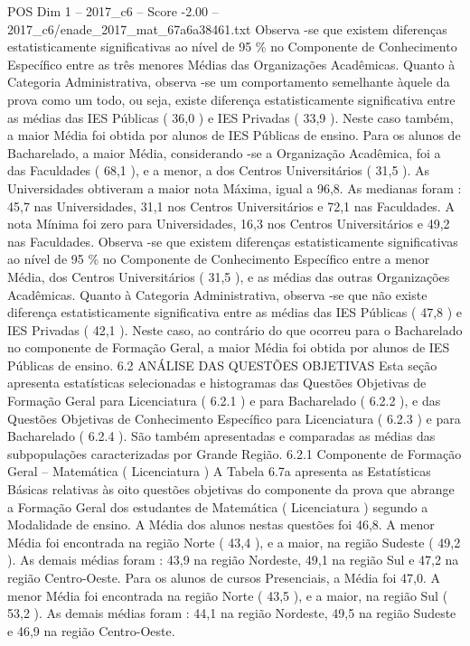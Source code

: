 \begin{textsample}{POS Dim 1 – 2017\_c6 – Score -2.00 – 2017\_c6/enade\_2017\_mat\_67a6a38461.txt}
Observa -se que existem diferenças estatisticamente significativas ao nível de 95 \% no Componente de Conhecimento Específico entre as três menores Médias das Organizações Acadêmicas.
Quanto à Categoria Administrativa, observa -se um comportamento semelhante àquele da prova como um todo, ou seja, existe diferença estatisticamente significativa entre as médias das IES Públicas ( 36,0 ) e IES Privadas ( 33,9 ).
Neste caso também, a maior Média foi obtida por alunos de IES Públicas de ensino.
Para os alunos de Bacharelado, a maior Média, considerando -se a Organização Acadêmica, foi a das Faculdades ( 68,1 ), e a menor, a dos Centros Universitários ( 31,5 ).
As Universidades obtiveram a maior nota Máxima, igual a 96,8.
As medianas foram : 45,7 nas Universidades, 31,1 nos Centros Universitários e 72,1 nas Faculdades.
A nota Mínima foi zero para Universidades, 16,3 nos Centros Universitários e 49,2 nas Faculdades.
Observa -se que existem diferenças estatisticamente significativas ao nível de 95 \% no Componente de Conhecimento Específico entre a menor Média, dos Centros Universitários ( 31,5 ), e as médias das outras Organizações Acadêmicas.
Quanto à Categoria Administrativa, observa -se que não existe diferença estatisticamente significativa entre as médias das IES Públicas ( 47,8 ) e IES Privadas ( 42,1 ).
Neste caso, ao contrário do que ocorreu para o Bacharelado no componente de Formação Geral, a maior Média foi obtida por alunos de IES Públicas de ensino. 6.2 ANÁLISE DAS QUESTÕES OBJETIVAS Esta seção apresenta estatísticas selecionadas e histogramas das Questões Objetivas de Formação Geral para Licenciatura ( 6.2.1 ) e para Bacharelado ( 6.2.2 ), e das Questões Objetivas de Conhecimento Específico para Licenciatura ( 6.2.3 ) e para Bacharelado ( 6.2.4 ).
São também apresentadas e comparadas as médias das subpopulações caracterizadas por Grande Região. 6.2.1 Componente de Formação Geral – Matemática ( Licenciatura ) A Tabela 6.7a apresenta as Estatísticas Básicas relativas às oito questões objetivas do componente da prova que abrange a Formação Geral dos estudantes de Matemática ( Licenciatura ) segundo a Modalidade de ensino.
A Média dos alunos nestas questões foi 46,8.
A menor Média foi encontrada na região Norte ( 43,4 ), e a maior, na região Sudeste ( 49,2 ).
As demais médias foram : 43,9 na região Nordeste, 49,1 na região Sul e 47,2 na região Centro-Oeste.
Para os alunos de cursos Presenciais, a Média foi 47,0.
A menor Média foi encontrada na região Norte ( 43,5 ), e a maior, na região Sul ( 53,2 ).
As demais médias foram : 44,1 na região Nordeste, 49,5 na região Sudeste e 46,9 na região Centro-Oeste.

\end{textsample}
